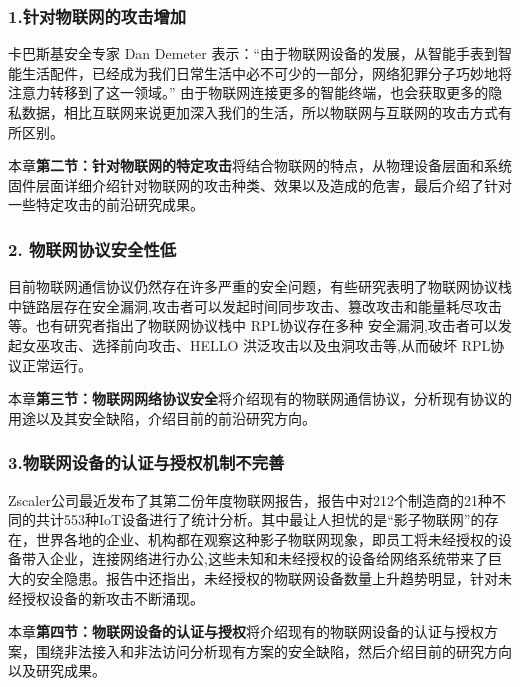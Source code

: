 \subsubsection{\textcolor{myblue}{\textbf{1.针对物联网的攻击增加}}}

卡巴斯基安全专家 Dan Demeter 表示：“由于物联网设备的发展，从智能手表到智能生活配件，已经成为我们日常生活中必不可少的一部分，网络犯罪分子巧妙地将注意力转移到了这一领域。” 由于物联网连接更多的智能终端，也会获取更多的隐私数据，相比互联网来说更加深入我们的生活，所以物联网与互联网的攻击方式有所区别。

本章\textcolor{myblue}{\textbf{第二节：针对物联网的特定攻击}}将结合物联网的特点，从物理设备层面和系统固件层面详细介绍针对物联网的攻击种类、效果以及造成的危害，最后介绍了针对一些特定攻击的前沿研究成果。

\subsubsection{\textcolor{myblue}{\textbf{2. 物联网协议安全性低}}}

目前物联网通信协议仍然存在许多严重的安全问题\cite{ref1}，有些研究\cite{ref2,ref3,ref4}表明了物联网协议栈中链路层存在安全漏洞,攻击者可以发起时间同步攻击、篡改攻击和能量耗尽攻击等。也有研究者\cite{ref5,ref6}指出了物联网协议栈中 RPL协议存在多种 安全漏洞,攻击者可以发起女巫攻击、选择前向攻击、HELLO 洪泛攻击以及虫洞攻击等,从而破坏 RPL协议正常运行。

本章\textcolor{myblue}{\textbf{第三节：物联网网络协议安全}}将介绍现有的物联网通信协议，分析现有协议的用途以及其安全缺陷，介绍目前的前沿研究方向。

\subsubsection{\textcolor{myblue}{\textbf{3.物联网设备的认证与授权机制不完善}}}

Zscaler公司最近发布了其第二份年度物联网报告，报告中对212个制造商的21种不同的共计553种IoT设备进行了统计分析。其中最让人担忧的是“影子物联网”的存在，世界各地的企业、机构都在观察这种影子物联网现象，即员工将未经授权的设备带入企业，连接网络进行办公,这些未知和未经授权的设备给网络系统带来了巨大的安全隐患。报告中还指出，未经授权的物联网设备数量上升趋势明显，针对未经授权设备的新攻击不断涌现。

本章\textcolor{myblue}{\textbf{第四节：物联网设备的认证与授权}}将介绍现有的物联网设备的认证与授权方案，围绕非法接入和非法访问分析现有方案的安全缺陷，然后介绍目前的研究方向以及研究成果。

